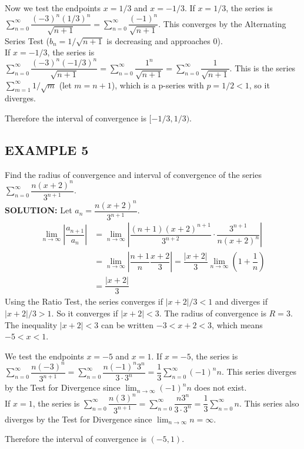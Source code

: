 \documentclass{article}
\theoremstyle{mystyle}
\begin{document}
Now we test the endpoints \(x=1/3\) and \(x=-1/3\).
If \(x=1/3\), the series is \( \sum_{n=0}^\infty \dfrac{(-3)^n (1/3)^n}{\sqrt{n+1}} = \sum_{n=0}^\infty \dfrac{(-1)^n}{\sqrt{n+1}} \). This converges by the Alternating Series Test (\(b_n = 1/\sqrt{n+1}\) is decreasing and approaches 0).\\
If \(x=-1/3\), the series is \( \sum_{n=0}^\infty \dfrac{(-3)^n (-1/3)^n}{\sqrt{n+1}} = \sum_{n=0}^\infty \dfrac{1^n}{\sqrt{n+1}} = \sum_{n=0}^\infty \dfrac{1}{\sqrt{n+1}} \). This is the series \( \sum_{m=1}^\infty 1/\sqrt{m} \) (let \(m=n+1\)), which is a p-series with \(p=1/2 < 1\), so it diverges.

Therefore the interval of convergence is \([-1/3, 1/3)\).

\subsection*{EXAMPLE 5}
Find the radius of convergence and interval of convergence of the series \( \sum_{n=0}^{\infty} \dfrac{n(x+2)^n}{3^{n+1}} \).\\
\textbf{SOLUTION:}
Let \(a_n = \dfrac{n(x+2)^n}{3^{n+1}}\).
\begin{align*}
    \lim_{n\to\infty} \left| \dfrac{a_{n+1}}{a_n} \right| &= \lim_{n\to\infty} \left| \dfrac{(n+1)(x+2)^{n+1}}{3^{n+2}} \cdot \dfrac{3^{n+1}}{n(x+2)^n} \right| \\
    &= \lim_{n\to\infty} \left| \dfrac{n+1}{n} \dfrac{x+2}{3} \right| = \dfrac{|x+2|}{3} \lim_{n\to\infty} \left(1+\dfrac{1}{n}\right) \\
    &= \dfrac{|x+2|}{3}
\end{align*}
Using the Ratio Test, the series converges if \(|x+2|/3 < 1\) and diverges if \(|x+2|/3 > 1\). So it converges if \(|x+2| < 3\).
The radius of convergence is \(R=3\).
The inequality \(|x+2|<3\) can be written \(-3 < x+2 < 3\), which means \(-5 < x < 1\).

We test the endpoints \(x=-5\) and \(x=1\).
If \(x=-5\), the series is \( \sum_{n=0}^\infty \dfrac{n(-3)^n}{3^{n+1}} = \sum_{n=0}^\infty \dfrac{n(-1)^n 3^n}{3 \cdot 3^n} = \dfrac{1}{3} \sum_{n=0}^\infty (-1)^n n \). This series diverges by the Test for Divergence since \( \lim_{n\to\infty} (-1)^n n \) does not exist.\\
If \(x=1\), the series is \( \sum_{n=0}^\infty \dfrac{n(3)^n}{3^{n+1}} = \sum_{n=0}^\infty \dfrac{n 3^n}{3 \cdot 3^n} = \dfrac{1}{3} \sum_{n=0}^\infty n \). This series also diverges by the Test for Divergence since \( \lim_{n\to\infty} n = \infty \).

Therefore the interval of convergence is \((-5, 1)\).
\end{document}
